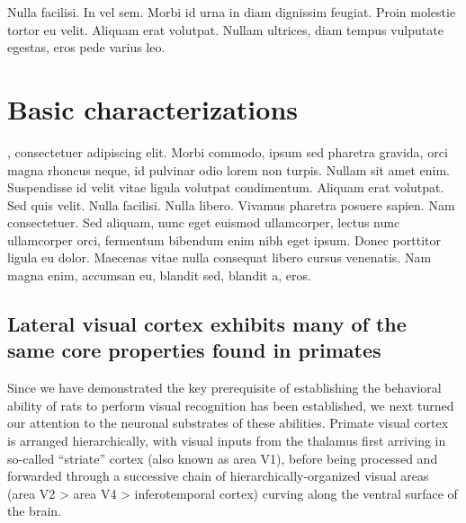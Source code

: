 \begin{savequote}[75mm]
Nulla facilisi. In vel sem. Morbi id urna in diam dignissim feugiat. Proin molestie tortor eu velit. Aliquam erat volutpat. Nullam ultrices, diam tempus vulputate egestas, eros pede varius leo.
\end{savequote}

\chapter{Basic characterizations}

, consectetuer adipiscing elit. Morbi commodo, ipsum sed pharetra gravida, orci magna rhoncus neque, id pulvinar odio lorem non turpis. Nullam sit amet enim. Suspendisse id velit vitae ligula volutpat condimentum. Aliquam erat volutpat. Sed quis velit. Nulla facilisi. Nulla libero. Vivamus pharetra posuere sapien. Nam consectetuer. Sed aliquam, nunc eget euismod ullamcorper, lectus nunc ullamcorper orci, fermentum bibendum enim nibh eget ipsum. Donec porttitor ligula eu dolor. Maecenas vitae nulla consequat libero cursus venenatis. Nam magna enim, accumsan eu, blandit sed, blandit a, eros.



\section{Lateral visual cortex exhibits many of the same core properties found in primates}

Since we have demonstrated the key prerequisite of establishing the behavioral ability of rats to perform visual recognition has been established, we next turned our attention to the neuronal substrates of these abilities.  Primate visual cortex is arranged hierarchically, with visual inputs from the thalamus first arriving in so-called ``striate'' cortex (also known as area V1), before being processed and forwarded through a successive chain of hierarchically-organized visual areas (area V2 > area V4 > inferotemporal cortex) curving along the ventral surface of the brain.  

